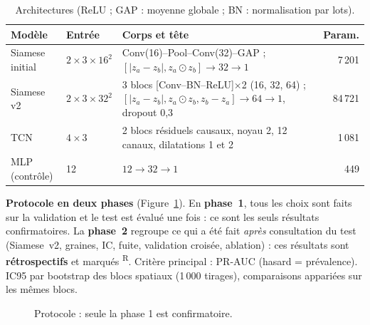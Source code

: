 \documentclass[10pt,a4paper,twocolumn]{article}
\newcommand{\retro}{\textcolor{retro}{\textsuperscript{\textsf{R}}}}
\begin{document}
\begin{table}[!htb]
\centering\footnotesize
\caption{Architectures (ReLU ; GAP : moyenne globale ; BN : normalisation par lots).}
\label{tab:arch}
\setlength{\tabcolsep}{2pt}
\begin{tabular}{@{}lL{1.3cm}L{3.4cm}r@{}}
\toprule
Modèle & Entrée & Corps et tête & Param. \\
\midrule
Siamese initial & $2{\times}3{\times}16^2$ & Conv(16)--Pool--Conv(32)--GAP ; $[|z_a{-}z_b|, z_a{\odot}z_b]\to32\to1$ & 7\,201 \\
Siamese v2 & $2{\times}3{\times}32^2$ & 3 blocs [Conv--BN--ReLU]$\times$2 (16, 32, 64) ; $[|z_a{-}z_b|, z_a{\odot}z_b, z_b{-}z_a]\to64\to1$, dropout 0,3 & 84\,721 \\
TCN & $4\times3$ & 2 blocs résiduels causaux, noyau 2, 12 canaux, dilatations 1 et 2 & 1\,081 \\
MLP (contrôle) & 12 & $12\to32\to1$ & 449 \\
\bottomrule
\end{tabular}
\end{table}

\textbf{Protocole en deux phases} (Figure~\ref{fig:proto}). En \textbf{phase~1}, tous les choix sont faits sur la validation et le
test est évalué une fois : ce sont les seuls résultats confirmatoires. La \textbf{phase~2} regroupe ce qui a été fait
\emph{après} consultation du test (Siamese~v2, graines, IC, fuite, validation croisée, ablation) : ces résultats sont
\textbf{rétrospectifs} et marqués \retro{}. Critère principal : PR-AUC (hasard = prévalence). IC95 par bootstrap des blocs
spatiaux (1\,000 tirages), comparaisons appariées sur les mêmes blocs.

\begin{figure}[!htb]
\centering
{}
\caption{Protocole : seule la phase 1 est confirmatoire.}
\label{fig:proto}
\end{figure}
\end{document}

